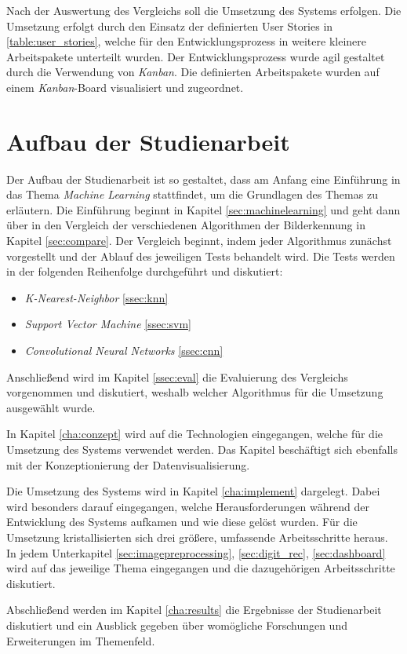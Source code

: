 Nach der Auswertung des Vergleichs soll die Umsetzung des Systems erfolgen. Die Umsetzung erfolgt durch den Einsatz der definierten User Stories in \ref{table:user_stories}, welche für den Entwicklungsprozess in weitere kleinere Arbeitspakete unterteilt wurden. Der Entwicklungsprozess wurde agil gestaltet durch die Verwendung von \textit{Kanban}. Die definierten Arbeitspakete wurden auf einem \textit{Kanban}-Board visualisiert und zugeordnet.

\section{Aufbau der Studienarbeit}
Der Aufbau der Studienarbeit ist so gestaltet, dass am Anfang eine Einführung in das Thema \textit{Machine Learning} stattfindet, um die Grundlagen des Themas zu erläutern. Die Einführung beginnt in Kapitel \ref{sec:machinelearning} und geht dann über in den Vergleich der verschiedenen Algorithmen der Bilderkennung in Kapitel \ref{sec:compare}. Der Vergleich beginnt, indem jeder Algorithmus zunächst vorgestellt und der Ablauf des jeweiligen Tests behandelt wird. Die Tests werden in der folgenden Reihenfolge durchgeführt und diskutiert:
\begin{itemize}
    \item \textit{K-Nearest-Neighbor} \ref{ssec:knn}
    \item \textit{Support Vector Machine} \ref{ssec:svm}
    \item \textit{Convolutional Neural Networks} \ref{ssec:cnn}
\end{itemize}

Anschließend wird im Kapitel \ref{ssec:eval} die Evaluierung des Vergleichs vorgenommen und diskutiert, weshalb welcher Algorithmus für die Umsetzung ausgewählt wurde.

In Kapitel \ref{cha:conzept} wird auf die Technologien eingegangen, welche für die Umsetzung des Systems verwendet werden. Das Kapitel beschäftigt sich ebenfalls mit der Konzeptionierung der Datenvisualisierung.

Die Umsetzung des Systems wird in Kapitel \ref{cha:implement} dargelegt. Dabei wird besonders darauf eingegangen, welche Herausforderungen während der Entwicklung des Systems aufkamen und wie diese gelöst wurden. Für die Umsetzung kristallisierten sich drei größere, umfassende Arbeitsschritte heraus. In jedem Unterkapitel \ref{sec:imagepreprocessing}, \ref{sec:digit_rec}, \ref{sec:dashboard} wird auf das jeweilige Thema eingegangen und die dazugehörigen Arbeitsschritte diskutiert.

Abschließend werden im Kapitel \ref{cha:results} die Ergebnisse der Studienarbeit diskutiert und ein Ausblick gegeben über womögliche Forschungen und Erweiterungen im Themenfeld.